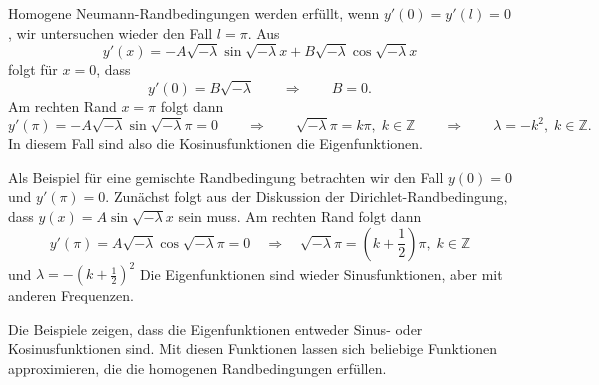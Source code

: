 Homogene Neumann-Randbedingungen werden erfüllt, wenn $y'(0)=y'(l)=0$,
wir untersuchen wieder den Fall $l=\pi$.
Aus
\[
y'(x)
=
-A\!\sqrt{-\lambda}\sin\!\sqrt{-\lambda} x 
+
B\!\sqrt{-\lambda}\cos\!\sqrt{-\lambda} x 
\]
folgt für $x=0$, dass
\[
y'(0)
=
B\!\sqrt{-\lambda}
\qquad\Rightarrow\qquad B=0.
\]
Am rechten Rand $x=\pi$ folgt dann
\[
y'(\pi)
=
-A\!\sqrt{-\lambda}\sin\!\sqrt{-\lambda}\pi
=
0
\qquad\Rightarrow\qquad
\!\sqrt{-\lambda}\pi = k\pi,\; k\in\mathbb{Z}
\qquad\Rightarrow\qquad
\lambda=-k^2,\;k\in\mathbb{Z}.
\]
In diesem Fall sind also die Kosinusfunktionen die Eigenfunktionen.

Als Beispiel für eine gemischte Randbedingung betrachten wir den
Fall $y(0)=0$ und $y'(\pi)=0$.
Zunächst folgt aus der Diskussion der Dirichlet-Randbedingung, dass
$y(x)=A\sin\!\sqrt{-\lambda}x$ sein muss.
Am rechten Rand folgt dann
\[
y'(\pi)
=
A\!\sqrt{-\lambda}\cos\!\sqrt{-\lambda}\pi
=
0
\quad\Rightarrow\quad
\!\sqrt{-\lambda}\pi = (k+{\textstyle\frac12})\pi,\;k\in\mathbb{Z}
\]
und $\lambda = -(k+{\textstyle\frac12})^2$
Die Eigenfunktionen sind wieder Sinusfunktionen, aber mit anderen
Frequenzen.

Die Beispiele zeigen, dass die Eigenfunktionen entweder Sinus-
oder Kosinusfunktionen sind.
Mit diesen Funktionen lassen sich beliebige Funktionen approximieren,
die die homogenen Randbedingungen erfüllen.

%
%
